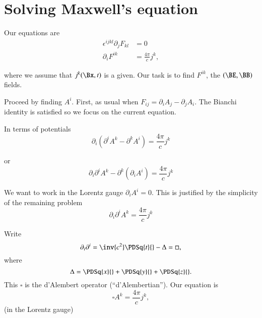 %
%
\section{Solving Maxwell's equation}

Our equations are
%
\begin{equation}\label{eqn:relativisticElectrodynamicsL17b:210}
\begin{aligned}
\epsilon^{i j k l} \partial_j F_{k l} &= 0 \\
\partial_i F^{i k} &= \frac{4 \pi}{c} j^k,
\end{aligned}
\end{equation}

where we assume that \(j^k(\Bx, t)\) is a given.  Our task is to find \(F^{i k}\), the \((\BE, \BB)\) fields.

Proceed by finding \(A^i\).  First, as usual when \(F_{i j} = \partial_i A_j - \partial_j A_i\).  The Bianchi identity is satisfied so we focus on the current equation.

In terms of potentials
%
\begin{equation}\label{eqn:relativisticElectrodynamicsL17b:230}
\partial_i (\partial^i A^k - \partial^k A^i) = \frac{ 4 \pi}{c} j^k
\end{equation}

or
%
\begin{equation}\label{eqn:relativisticElectrodynamicsL17b:250}
\partial_i \partial^i A^k - \partial^k (\partial_i A^i) = \frac{ 4 \pi}{c} j^k
\end{equation}

We want to work in the Lorentz gauge \(\partial_i A^i = 0\).  This is justified by the simplicity of the remaining problem
%
\begin{equation}\label{eqn:relativisticElectrodynamicsL17b:270}
\partial_i \partial^i A^k = \frac{4 \pi}{c} j^k
\end{equation}

Write
%
\begin{equation}\label{eqn:relativisticElectrodynamicsL17b:290}
\partial_i \partial^i = \inv{c^2} \PDSq{t}{} - \Delta = \square,
\end{equation}
where
\begin{equation}\label{eqn:relativisticElectrodynamicsL17b:291}
\Delta = \PDSq{x}{} + \PDSq{y}{} + \PDSq{z}{}.
\end{equation}
This \(\square\) is the d'Alembert operator (``d'Alembertian'').
Our equation is
%
\begin{equation}\label{eqn:relativisticElectrodynamicsL17b:310}
\square A^k = \frac{4 \pi}{c} j^k,
\end{equation}
(in the Lorentz gauge)

